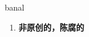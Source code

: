 
\begin{frame}
{\huge banal}
\begin{center}
\begin{enumerate}\Large
  \item \textbf{非原创的，陈腐的}
\end{enumerate}
\end{center}
\end{frame}
